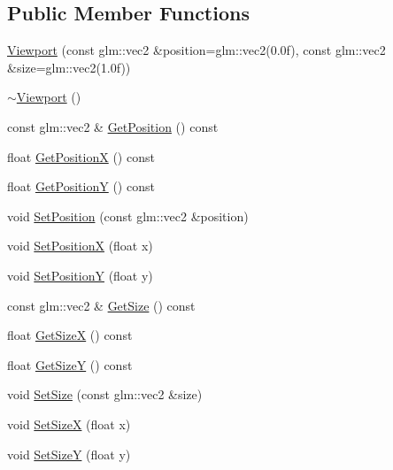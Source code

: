 \subsection*{Public Member Functions}
\begin{DoxyCompactItemize}
\item 
\mbox{\hyperlink{classec_1_1_viewport_a287d09d9303d9fbbea3c915f832d2ab8}{Viewport}} (const glm\+::vec2 \&position=glm\+::vec2(0.\+0f), const glm\+::vec2 \&size=glm\+::vec2(1.\+0f))
\item 
\mbox{\hyperlink{classec_1_1_viewport_a65341c63372c6158a0a2932fa1f2c66b}{$\sim$\+Viewport}} ()
\item 
const glm\+::vec2 \& \mbox{\hyperlink{classec_1_1_viewport_aee8a504b5b66702a627cc13aa3e4ac94}{Get\+Position}} () const
\item 
float \mbox{\hyperlink{classec_1_1_viewport_a9eb9dd217b11d9f7fa1ffb2c76bc60a9}{Get\+PositionX}} () const
\item 
float \mbox{\hyperlink{classec_1_1_viewport_ab3b320481304aec2aee3f1ee53793898}{Get\+PositionY}} () const
\item 
void \mbox{\hyperlink{classec_1_1_viewport_a880a53af6b1b80bd30dec3da38e4a653}{Set\+Position}} (const glm\+::vec2 \&position)
\item 
void \mbox{\hyperlink{classec_1_1_viewport_a02f3a376956b1f7234efcaa26bedf064}{Set\+PositionX}} (float x)
\item 
void \mbox{\hyperlink{classec_1_1_viewport_abe18d636e8f53f087b3cb7a21699fb93}{Set\+PositionY}} (float y)
\item 
const glm\+::vec2 \& \mbox{\hyperlink{classec_1_1_viewport_a128183b59733fcef73d52a9f61f82181}{Get\+Size}} () const
\item 
float \mbox{\hyperlink{classec_1_1_viewport_ad1d046f5f6da951f420cf6bae52bfb44}{Get\+SizeX}} () const
\item 
float \mbox{\hyperlink{classec_1_1_viewport_aae60019c1f37603b065f7d38b760764b}{Get\+SizeY}} () const
\item 
void \mbox{\hyperlink{classec_1_1_viewport_a9e8bd48f0bb12b8a45502d766d6e1b76}{Set\+Size}} (const glm\+::vec2 \&size)
\item 
void \mbox{\hyperlink{classec_1_1_viewport_a8bee5a207bb2919c04624aa7b9d3af34}{Set\+SizeX}} (float x)
\item 
void \mbox{\hyperlink{classec_1_1_viewport_aca8b10d6c70358e579980c7a32efd21c}{Set\+SizeY}} (float y)
\end{DoxyCompactItemize}


